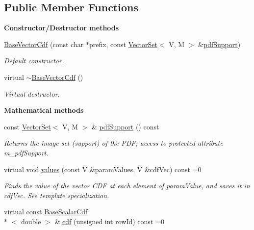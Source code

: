 \subsection*{Public Member Functions}
\begin{Indent}{\bf Constructor/\-Destructor methods}\par
\begin{DoxyCompactItemize}
\item 
\hyperlink{class_q_u_e_s_o_1_1_base_vector_cdf_ac7d0efcc78675e5ecc0ec684841c70e2}{Base\-Vector\-Cdf} (const char $\ast$prefix, const \hyperlink{class_q_u_e_s_o_1_1_vector_set}{Vector\-Set}$<$ V, M $>$ \&\hyperlink{class_q_u_e_s_o_1_1_base_vector_cdf_aaf5088d3994606a9d449ccd414509709}{pdf\-Support})
\begin{DoxyCompactList}\small\item\em Default constructor. \end{DoxyCompactList}\item 
virtual \hyperlink{class_q_u_e_s_o_1_1_base_vector_cdf_a0b3bcef9ed025de3184649c46c72cafb}{$\sim$\-Base\-Vector\-Cdf} ()
\begin{DoxyCompactList}\small\item\em Virtual destructor. \end{DoxyCompactList}\end{DoxyCompactItemize}
\end{Indent}
\begin{Indent}{\bf Mathematical methods}\par
\begin{DoxyCompactItemize}
\item 
const \hyperlink{class_q_u_e_s_o_1_1_vector_set}{Vector\-Set}$<$ V, M $>$ \& \hyperlink{class_q_u_e_s_o_1_1_base_vector_cdf_aaf5088d3994606a9d449ccd414509709}{pdf\-Support} () const 
\begin{DoxyCompactList}\small\item\em Returns the image set (support) of the P\-D\-F; access to protected attribute {\ttfamily m\-\_\-pdf\-Support}. \end{DoxyCompactList}\item 
virtual void \hyperlink{class_q_u_e_s_o_1_1_base_vector_cdf_a30b15bde5a206071b4e4db26141ce179}{values} (const V \&param\-Values, V \&cdf\-Vec) const =0
\begin{DoxyCompactList}\small\item\em Finds the value of the vector C\-D\-F at each element of {\ttfamily param\-Value}, and saves it in {\ttfamily cdf\-Vec}. See template specialization. \end{DoxyCompactList}\item 
virtual const \hyperlink{class_q_u_e_s_o_1_1_base_scalar_cdf}{Base\-Scalar\-Cdf}\\*
$<$ double $>$ \& \hyperlink{class_q_u_e_s_o_1_1_base_vector_cdf_aac430df67c3f278eb14b1691b9fedbb2}{cdf} (unsigned int row\-Id) const =0
\end{DoxyCompactItemize}
\end{Indent}
